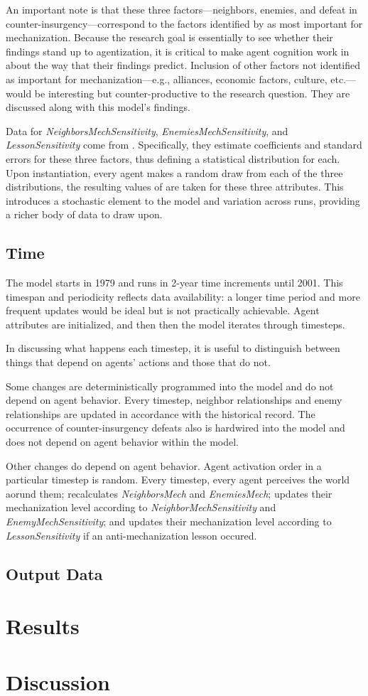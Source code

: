 \documentclass{article}
\begin{document}
An important note is that these three factors---neighbors, enemies, and
defeat in counter-insurgency---correspond to the factors identified by 
\cite{sechser2010army} as most important for mechanization. Because the research
goal is essentially to see whether their findings stand up to agentization,
it is critical to make agent cognition work in about the way that their findings
predict. Inclusion of other factors not identified as important for
mechanization---e.g., alliances, economic factors,
culture, etc.---would be interesting but counter-productive to the research
question. They are discussed along with this model's findings. 

Data for \textit{NeighborsMechSensitivity}, \textit{EnemiesMechSensitivity}, and
\textit{LessonSensitivity} come from \cite{sechser2010army}. Specifically, they
estimate coefficients and standard errors for these three factors, thus defining
a statistical distribution for each. Upon instantiation, every agent makes a
random draw from each of the three distributions, the resulting values of are
taken for these three attributes. This introduces a stochastic element to the
model and variation across runs, providing a richer body of data to draw upon.

\subsection{Time}

The model starts in 1979 and runs in 2-year time increments until 2001. This
timespan and periodicity reflects data availability: a longer time period and
more frequent updates would be ideal but is not practically achievable. Agent
attributes are initialized, and then then the model iterates through timesteps.

In discussing what happens each timestep, it is useful to distinguish between
things that depend on agents' actions and those that do not.

Some changes are deterministically programmed into the model and do not depend on
agent behavior. Every timestep, neighbor relationships and enemy relationships
are updated in accordance with the historical record. The occurrence of
counter-insurgency defeats also is hardwired into the model and does not depend
on agent behavior within the model.

Other changes do depend on agent behavior. Agent activation order in a
particular timestep is random. Every timestep, every agent perceives the world
aorund them; recalculates \textit{NeighborsMech} and \textit{EnemiesMech};
updates their mechanization level according to \textit{NeighborMechSensitivity}
and \textit{EnemyMechSensitivity}; and updates their mechanization level
according to \textit{LessonSensitivity} if an anti-mechanization lesson occured.


\subsection{Output Data}


\section{Results}

\section{Discussion}
\printbibliography[heading=bibnumbered]
\end{document}
